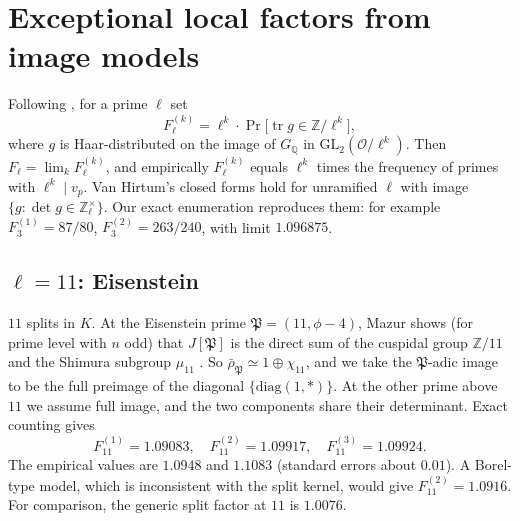 \documentclass[11pt]{amsart}
\theoremstyle{definition}
\theoremstyle{remark}
\newcommand{\Q}{\mathbb{Q}}
\newcommand{\Z}{\mathbb{Z}}
\newcommand{\cO}{\mathcal{O}}
\newcommand{\GL}{\mathrm{GL}}
\newcommand{\tr}{\operatorname{tr}}
\begin{document}
\section{Exceptional local factors from image models}\label{sec:local}

Following \cite{VH,Amri}, for a prime $\ell$ set
\[
F_\ell^{(k)}=\ell^k\cdot\Pr\big[\tr g\in\Z/\ell^k\big],
\]
where $g$ is Haar-distributed on the image of $G_\Q$ in $\GL_2(\cO/\ell^k)$. Then $F_\ell=\lim_kF_\ell^{(k)}$, and empirically $F_\ell^{(k)}$ equals $\ell^k$ times the frequency of primes with $\ell^k\mid v_p$. Van Hirtum's closed forms \cite[Props.~5.5--5.8]{VH} hold for unramified $\ell$ with image $\{g:\det g\in\Z_\ell^\times\}$. Our exact enumeration reproduces them: for example $F_3^{(1)}=87/80$, $F_3^{(2)}=263/240$, with limit $1.096875$.

\subsection{\texorpdfstring{$\ell=11$}{l=11}: Eisenstein}
$11$ splits in $K$. At the Eisenstein prime $\mathfrak P=(11,\phi-4)$, Mazur shows (for prime level with $n$ odd) that $J[\mathfrak P]$ is the direct sum of the cuspidal group $\Z/11$ and the Shimura subgroup $\mu_{11}$ \cite{Mazur}. So $\bar\rho_{\mathfrak P}\simeq1\oplus\chi_{11}$, and we take the $\mathfrak P$-adic image to be the full preimage of the diagonal $\{\mathrm{diag}(1,*)\}$. At the other prime above $11$ we assume full image, and the two components share their determinant. Exact counting gives
\[
F_{11}^{(1)}=1.09083,\quad F_{11}^{(2)}=1.09917,\quad F_{11}^{(3)}=1.09924 .
\]
The empirical values are $1.0948$ and $1.1083$ (standard errors about $0.01$). A Borel-type model, which is inconsistent with the split kernel, would give $F_{11}^{(2)}=1.0916$. For comparison, the generic split factor at $11$ is $1.0076$.
\end{document}
